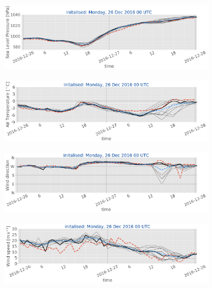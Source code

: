 \begin{figure}[H]\ContinuedFloat
	\centering
	\begin{subfigure}[b]{0.75\textwidth}
		\includegraphics[trim={0.cm 1.5cm 0cm 0cm},clip,
		width=\textwidth]{./fig_sfc_pressure/20161226_00}
		\caption{}\label{fig:res:sfc_pres26}
	\end{subfigure}
	
	\begin{subfigure}[b]{0.75\textwidth}
		\includegraphics[trim={0.cm 1.5cm 0cm 0cm},clip,
		width=\textwidth]{./fig_sfc_temp/20161226_00}
		\caption{}\label{fig:res:sfc_temp26}
	\end{subfigure}
	
	\begin{subfigure}[b]{0.75\textwidth}
		\includegraphics[trim={0.cm 1.5cm 0cm 0cm},clip,
		width=\textwidth]{./fig_sfc_wd/20161226_00}
		\caption{}\label{fig:res:sfc_wd26}
	\end{subfigure}
	
	\begin{subfigure}[b]{0.75\textwidth}
		\includegraphics[trim={0.cm 1.5cm 0cm 0cm},clip,
		width=\textwidth]{./fig_sfc_ws/20161226_00}
		\caption{}\label{fig:res:sfc_ws26}
	\end{subfigure}
	

\end{figure}

